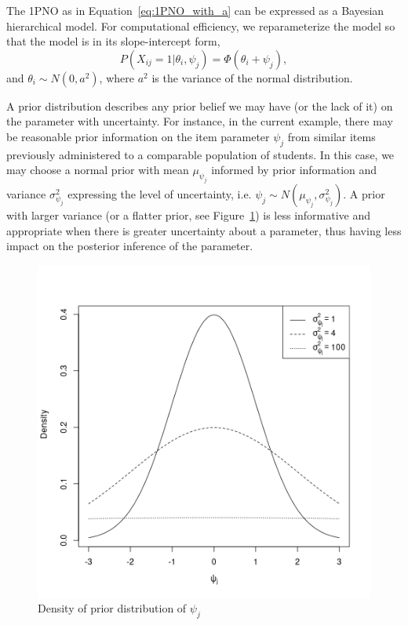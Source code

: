 \documentclass[floatsintext, man]{apa7}
\begin{document}
The 1PNO as in Equation~\ref{eq:1PNO_with_a} can be expressed as a Bayesian
hierarchical model. For computational efficiency, we reparameterize the model so
that the model is in its slope-intercept form,
\begin{equation}
  \label{eq:1PNO}
  P(X_{ij} = 1 | \theta_i, \psi_j) = \Phi(\theta_i + \psi_j),
\end{equation}
and $\theta_i \sim N(0, a^2)$, where $a^2$ is the variance of the normal
distribution.

A prior distribution describes any prior belief we may have (or the lack of it)
on the parameter with uncertainty. For instance, in the current example, there
may be reasonable prior information on the item parameter $\psi_j$ from similar
items previously administered to a
comparable population of students. In this case, we may choose a normal prior
with mean $\mu_{\psi_j}$ informed by prior information and variance $\sigma_
{\psi_j}^2$ expressing the level of
uncertainty, i.e. $\psi_j \sim N(\mu_{\psi_j}, \sigma_{\psi_j}^2)$. A prior with
larger variance (or a flatter prior, see Figure~\ref{fig:prior_density}) is
less informative and appropriate when there is greater uncertainty about a
parameter, thus having less impact on the posterior inference of the parameter. 
\begin{figure}[t]
\centering
  \includegraphics[scale = 0.5]{Fig/prior_normal.png}
  \caption{Density of prior distribution of $\psi_j$}
  \label{fig:prior_density}
\end{figure}
\end{document}

